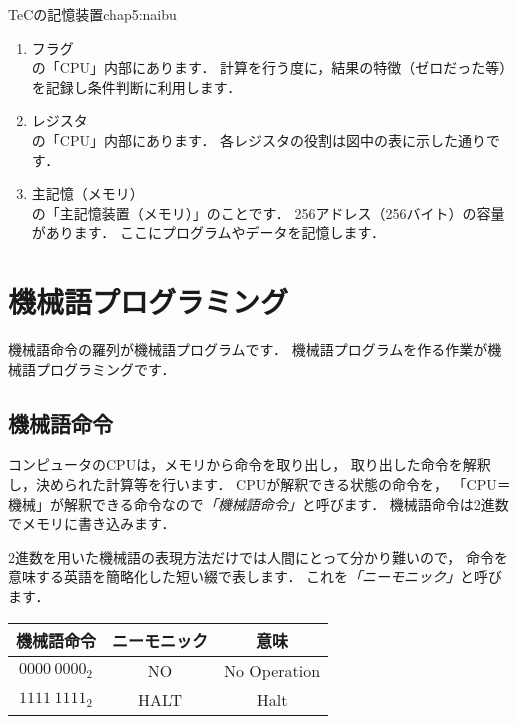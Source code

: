           {TeCの記憶装置}{chap5:naibu}

\begin{enumerate}
\item フラグ \\
  の「CPU」内部にあります．
  計算を行う度に，結果の特徴（ゼロだった等）を記録し条件判断に利用します．
\item レジスタ \\
  の「CPU」内部にあります．
  各レジスタの役割は図中の表に示した通りです．
\item 主記憶（メモリ） \\
  の「主記憶装置（メモリ）」のことです．
  256アドレス（256バイト）の容量があります．
  ここにプログラムやデータを記憶します．
\end{enumerate}

\newpage
\section{機械語プログラミング}
機械語命令の羅列が機械語プログラムです．
機械語プログラムを作る作業が機械語プログラミングです．

\subsection{機械語命令}
コンピュータのCPUは，メモリから命令を取り出し，
取り出した命令を解釈し，決められた計算等を行います．
CPUが解釈できる状態の命令を，
「CPU＝機械」が解釈できる命令なので\emph{「機械語命令」}と呼びます．
機械語命令は2進数でメモリに書き込みます．

2進数を用いた機械語の表現方法だけでは人間にとって分かり難いので，
命令を意味する英語を簡略化した短い綴で表します．
これを\emph{「ニーモニック」}と呼びます．

{\ttfamily\small\begin{center}
  \begin{tabular}{|c|c|c|} \hline
    機械語命令 & ニーモニック & 意味\\
    \hline
    $0000~0000_{2}$ & NO & No Operation \\
    $1111~1111_{2}$ & HALT & Halt \\
    \hline
  \end{tabular}
\end{center}}

